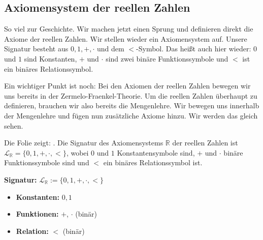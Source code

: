 \subsection{Axiomensystem der reellen Zahlen}

\begin{spoken-clean}[00:13:35 - 00:14:40]
So viel zur Geschichte. Wir machen jetzt einen Sprung und definieren direkt die Axiome der reellen Zahlen. Wir stellen wieder ein Axiomensystem auf. Unsere Signatur besteht aus $0, 1, +, \cdot$ und dem $<$-Symbol. Das heißt auch hier wieder: $0$ und $1$ sind Konstanten, $+$ und $\cdot$ sind zwei binäre Funktionssymbole und $<$ ist ein binäres Relationssymbol.

Ein wichtiger Punkt ist noch: Bei den Axiomen der reellen Zahlen bewegen wir uns bereits in der Zermelo-Fraenkel-Theorie. Um die reellen Zahlen überhaupt zu definieren, brauchen wir also bereits die Mengenlehre. Wir bewegen uns innerhalb der Mengenlehre und fügen nun zusätzliche Axiome hinzu. Wir werden das gleich sehen.
\end{spoken-clean}

\begin{meta-note}
Die Folie zeigt: . Die Signatur des Axiomensystems $\mathbb{R}$ der reellen Zahlen ist $\mathcal{L}_{\mathbb{R}} = \{0, 1, +, \cdot, <\}$, wobei $0$ und $1$ Konstantensymbole sind, $+$ und $\cdot$ binäre Funktionssymbole sind und $<$ ein binäres Relationssymbol ist.
\end{meta-note}

\begin{math-stroke}
\textbf{Signatur:} $\mathcal{L}_{\mathbb{R}} := \{0, 1, +, \cdot, <\}$
\begin{itemize}
    \item \textbf{Konstanten:} $0, 1$
    \item \textbf{Funktionen:} $+$, $\cdot$ (binär)
    \item \textbf{Relation:} $<$ (binär)
\end{itemize}
\end{math-stroke}

